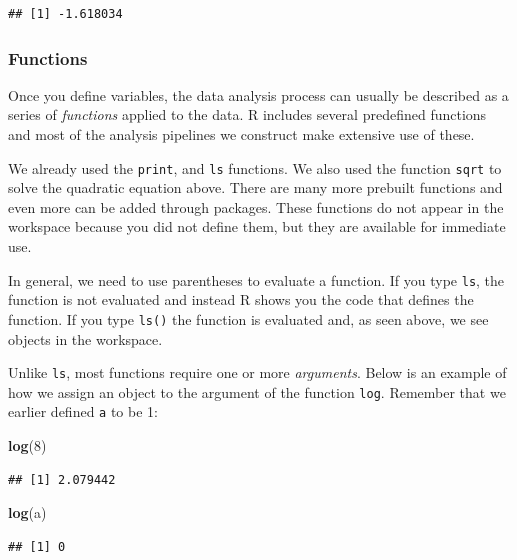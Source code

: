 \documentclass[
]{article}
\newenvironment{Shaded}{\begin{snugshade}}{\end{snugshade}}
\newcommand{\DecValTok}[1]{\textcolor[rgb]{0.00,0.00,0.81}{#1}}
\newcommand{\FunctionTok}[1]{\textcolor[rgb]{0.13,0.29,0.53}{\textbf{#1}}}
\newcommand{\NormalTok}[1]{#1}
\begin{document}
\begin{verbatim}
## [1] -1.618034
\end{verbatim}

\subsubsection{Functions}\label{functions}

Once you define variables, the data analysis process can usually be
described as a series of \emph{functions} applied to the data. R
includes several predefined functions and most of the analysis pipelines
we construct make extensive use of these.

We already used the \texttt{print}, and \texttt{ls} functions. We also
used the function \texttt{sqrt} to solve the quadratic equation above.
There are many more prebuilt functions and even more can be added
through packages. These functions do not appear in the workspace because
you did not define them, but they are available for immediate use.

In general, we need to use parentheses to evaluate a function. If you
type \texttt{ls}, the function is not evaluated and instead R shows you
the code that defines the function. If you type \texttt{ls()} the
function is evaluated and, as seen above, we see objects in the
workspace.

Unlike \texttt{ls}, most functions require one or more \emph{arguments}.
Below is an example of how we assign an object to the argument of the
function \texttt{log}. Remember that we earlier defined \texttt{a} to be
1:

\begin{Shaded}
\begin{Highlighting}[]
\FunctionTok{log}\NormalTok{(}\DecValTok{8}\NormalTok{)}
\end{Highlighting}
\end{Shaded}

\begin{verbatim}
## [1] 2.079442
\end{verbatim}

\begin{Shaded}
\begin{Highlighting}[]
\FunctionTok{log}\NormalTok{(a) }
\end{Highlighting}
\end{Shaded}

\begin{verbatim}
## [1] 0
\end{verbatim}
\end{document}
